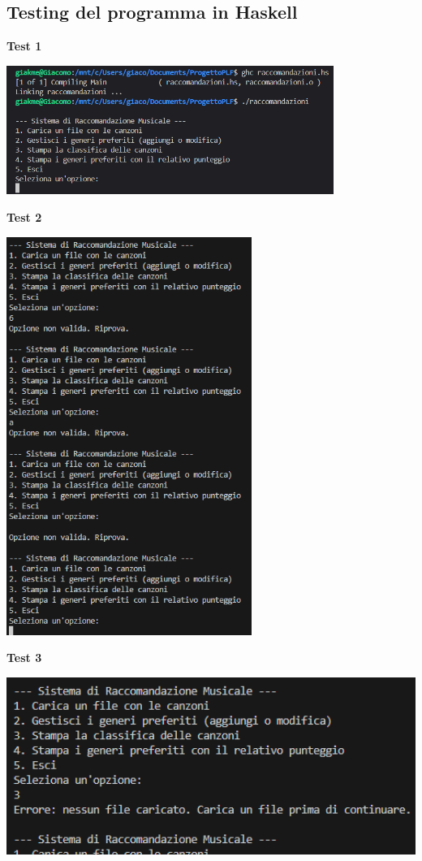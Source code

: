 \documentclass[a4paper,11pt]{article}
\begin{document}
    \subsection{Testing del programma in Haskell}
    \begin{center}
        \textbf{Test 1}
        \par
        \vspace{0.5cm}
        \includegraphics[width=0.8\textwidth]{Immagini/Tests/htest1.png}
    \end{center}
    \begin{center}
        \textbf{Test 2}
        \par
        \vspace{0.5cm}
        \includegraphics[width=0.6\textwidth]{Immagini/Tests/htest2}
    \end{center}
    \begin{center}
        \textbf{Test 3}
        \par
        \vspace{0.5cm}
        \includegraphics[width=1.0\textwidth]{Immagini/Tests/htest3}
    \end{center}
\end{document}
